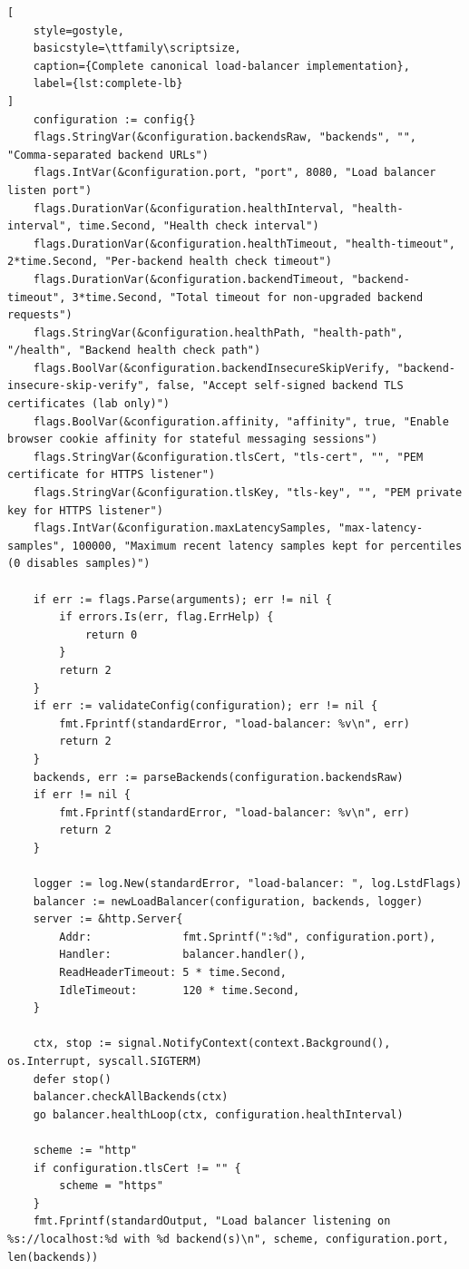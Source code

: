 \documentclass[12pt,a4paper]{article}
\begin{document}
\begin{lstlisting}[
    style=gostyle,
    basicstyle=\ttfamily\scriptsize,
    caption={Complete canonical load-balancer implementation},
    label={lst:complete-lb}
]
	configuration := config{}
	flags.StringVar(&configuration.backendsRaw, "backends", "", "Comma-separated backend URLs")
	flags.IntVar(&configuration.port, "port", 8080, "Load balancer listen port")
	flags.DurationVar(&configuration.healthInterval, "health-interval", time.Second, "Health check interval")
	flags.DurationVar(&configuration.healthTimeout, "health-timeout", 2*time.Second, "Per-backend health check timeout")
	flags.DurationVar(&configuration.backendTimeout, "backend-timeout", 3*time.Second, "Total timeout for non-upgraded backend requests")
	flags.StringVar(&configuration.healthPath, "health-path", "/health", "Backend health check path")
	flags.BoolVar(&configuration.backendInsecureSkipVerify, "backend-insecure-skip-verify", false, "Accept self-signed backend TLS certificates (lab only)")
	flags.BoolVar(&configuration.affinity, "affinity", true, "Enable browser cookie affinity for stateful messaging sessions")
	flags.StringVar(&configuration.tlsCert, "tls-cert", "", "PEM certificate for HTTPS listener")
	flags.StringVar(&configuration.tlsKey, "tls-key", "", "PEM private key for HTTPS listener")
	flags.IntVar(&configuration.maxLatencySamples, "max-latency-samples", 100000, "Maximum recent latency samples kept for percentiles (0 disables samples)")

	if err := flags.Parse(arguments); err != nil {
		if errors.Is(err, flag.ErrHelp) {
			return 0
		}
		return 2
	}
	if err := validateConfig(configuration); err != nil {
		fmt.Fprintf(standardError, "load-balancer: %v\n", err)
		return 2
	}
	backends, err := parseBackends(configuration.backendsRaw)
	if err != nil {
		fmt.Fprintf(standardError, "load-balancer: %v\n", err)
		return 2
	}

	logger := log.New(standardError, "load-balancer: ", log.LstdFlags)
	balancer := newLoadBalancer(configuration, backends, logger)
	server := &http.Server{
		Addr:              fmt.Sprintf(":%d", configuration.port),
		Handler:           balancer.handler(),
		ReadHeaderTimeout: 5 * time.Second,
		IdleTimeout:       120 * time.Second,
	}

	ctx, stop := signal.NotifyContext(context.Background(), os.Interrupt, syscall.SIGTERM)
	defer stop()
	balancer.checkAllBackends(ctx)
	go balancer.healthLoop(ctx, configuration.healthInterval)

	scheme := "http"
	if configuration.tlsCert != "" {
		scheme = "https"
	}
	fmt.Fprintf(standardOutput, "Load balancer listening on %s://localhost:%d with %d backend(s)\n", scheme, configuration.port, len(backends))


\end{lstlisting}
\end{document}
